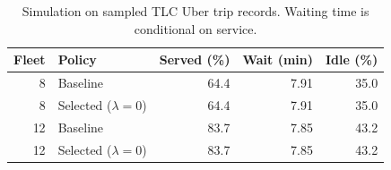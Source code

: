 \begin{table}[htbp]
\centering
\small
\caption{Simulation on sampled TLC Uber trip records. Waiting time is conditional on service.}
\label{tab:dispatch_results}
\begin{tabular}{rlrrr}
\hline
Fleet & Policy & Served (\%) & Wait (min) & Idle (\%) \\
\hline
8 & Baseline & 64.4 & 7.91 & 35.0 \\
8 & Selected ($\lambda=0$) & 64.4 & 7.91 & 35.0 \\
12 & Baseline & 83.7 & 7.85 & 43.2 \\
12 & Selected ($\lambda=0$) & 83.7 & 7.85 & 43.2 \\
\hline
\end{tabular}
\end{table}